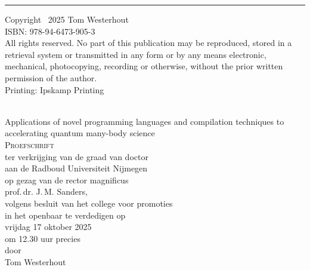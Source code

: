 \begin{titlingpage}
\footnotesize
\vspace*{\fill}
\vspace{0.18cm}\noindent\rule{\textwidth}{0.4pt}\vspace{0.2cm}

\noindent Copyright \textcopyright~2025 Tom Westerhout\\
ISBN: 978-94-6473-905-3 \\

\noindent All rights reserved. No part of this publication may be reproduced, stored in a retrieval system or transmitted in any form or by any means electronic, mechanical, photocopying, recording or otherwise, without the prior written permission of the author.\\

\noindent Printing: Ipskamp Printing
\end{titlingpage}

\begin{titlingpage}
\begin{center}
\hfill\\[1cm]
{\fontsize{16pt}{16pt}\selectfont Applications of novel programming languages and compilation techniques to accelerating quantum many-body science}\\[3cm]
\textsc{Proefschrift}\\[0.8cm]
ter verkrijging van de graad van doctor\\[0.1cm]
aan de Radboud Universiteit Nijmegen\\[0.1cm]
op gezag van de rector magnificus\\[0.1cm]
prof.\,dr. J.\,M. Sanders,\\[0.1cm]
volgens besluit van het college voor promoties\\[0.1cm]
in het openbaar te verdedigen op\\[0.8cm]
vrijdag 17 oktober 2025\\[0.1cm]
om 12.30 uur precies\\[3cm]
door\\[0.1cm]
Tom Westerhout
\end{center}
\end{titlingpage}

